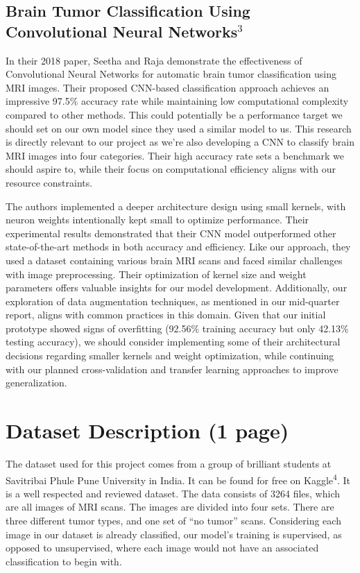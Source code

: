 \documentclass[conference]{IEEEtran}
\begin{document}
\subsection{\large Brain Tumor Classification Using Convolutional Neural Networks$^{3}$}

In their 2018 paper, Seetha and Raja demonstrate the effectiveness of Convolutional Neural Networks for automatic brain tumor classification using MRI images. Their proposed CNN-based classification approach achieves an impressive 97.5\% accuracy rate while maintaining low computational complexity compared to other methods. This could potentially be a performance target we should set on our own model since they used a similar model to us. This research is directly relevant to our project as we're also developing a CNN to classify brain MRI images into four categories. Their high accuracy rate sets a benchmark we should aspire to, while their focus on computational efficiency aligns with our resource constraints. 

The authors implemented a deeper architecture design using small kernels, with neuron weights intentionally kept small to optimize performance. Their experimental results demonstrated that their CNN model outperformed other state-of-the-art methods in both accuracy and efficiency. Like our approach, they used a dataset containing various brain MRI scans and faced similar challenges with image preprocessing. Their optimization of kernel size and weight parameters offers valuable insights for our model development. Additionally, our exploration of data augmentation techniques, as mentioned in our mid-quarter report, aligns with common practices in this domain. Given that our initial prototype showed signs of overfitting (92.56\% training accuracy but only 42.13\% testing accuracy), we should consider implementing some of their architectural decisions regarding smaller kernels and weight optimization, while continuing with our planned cross-validation and transfer learning approaches to improve generalization.


\section{\large Dataset Description (1 page)}

The dataset used for this project comes from a group of brilliant students at Savitribai Phule Pune University in India. It can be found for free on Kaggle\textsuperscript{4}. It is a well respected and reviewed dataset. The data consists of 3264 files, which are all images of MRI scans. The images are divided into four sets. There are three different tumor types, and one set of “no tumor” scans. Considering each image in our dataset is already classified, our model's training is supervised, as opposed to unsupervised, where each image would not have an associated classification to begin with.
\end{document}
